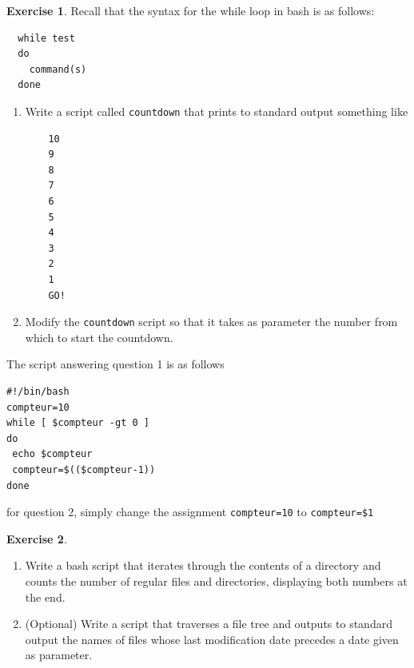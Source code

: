 \documentclass[a4paper,11pt]{article}
\theoremstyle{plain}
\theoremstyle{definition}
\newtheorem{exercice}{Exercise}
\begin{document}
\begin{exercice}
Recall that the syntax for the while loop in bash is as follows:
\begin{verbatim}
  while test
  do
    command(s)
  done
\end{verbatim}
\begin{enumerate}
\item
Write a script called \texttt{countdown} that prints to standard output something like
\begin{verbatim}
    10
    9
    8
    7
    6
    5
    4
    3
    2
    1
    GO!
\end{verbatim}
\item Modify the \texttt{countdown} script so that it takes as parameter the number from which to start the countdown.
\end{enumerate}
\end{exercice}

\begin{correction}
The script answering question 1 is as follows
\begin{verbatim}
#!/bin/bash
compteur=10
while [ $compteur -gt 0 ]
do
 echo $compteur
 compteur=$(($compteur-1))
done
\end{verbatim}
for question 2, simply change the assignment \texttt{compteur=10} to \texttt{compteur=\$1}
\end{correction}

\begin{exercice}
\begin{enumerate}
\item Write a bash script that iterates through the contents of a directory and counts the number of regular files and directories, displaying both numbers at the end.
\item  (Optional) Write a script that traverses a file tree and outputs to standard output the names of files whose last modification date precedes a date given as parameter.
\end{enumerate}
\end{exercice}
\end{document}
